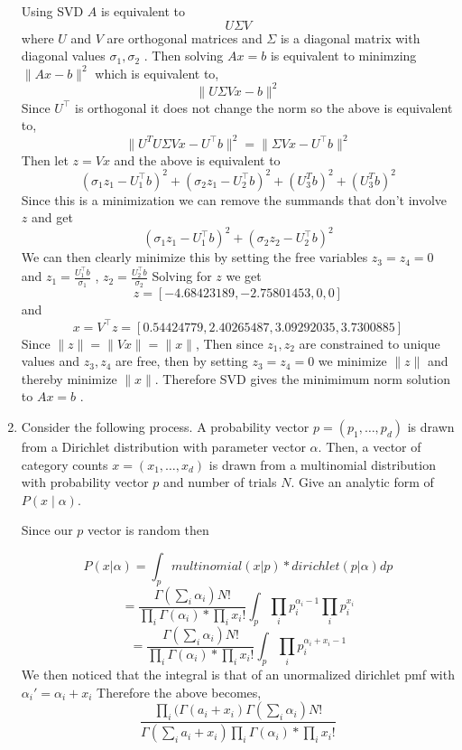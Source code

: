 \documentclass{article}
\begin{document}
\begin{enumerate}
\color{blue}
Using SVD $A$ is equivalent to 
$$
U \Sigma V
$$
where $U$ and $V$ are orthogonal matrices and $\Sigma$ is a diagonal matrix with diagonal values $\sigma_1, \sigma_2$ . 
Then solving $Ax = b$ is equivalent to minimzing $\lVert Ax - b \rVert ^ 2$ which is equivalent to,
$$
\lVert U \Sigma V x - b \rVert ^ 2
$$
Since $U^\top$ is orthogonal it does not change the norm so the above is equivalent to,
$$
\lVert U^T U \Sigma V x - U^\top b \rVert ^2 = \lVert \Sigma V x - U^\top b \rVert ^2
$$
Then let $z = V x$ and the above is equivalent to 
$$
(\sigma_1 z_1 - U_1^\top b)^2 + (\sigma_2 z_1 - U_2^\top b)^2  + (U_3^T b)^2 + (U_3^T b)^2
$$
Since this is a minimization we can remove the summands that don't involve $z$ and get
$$
(\sigma_1 z_1 - U_1^\top b)^2 + (\sigma_2 z_2 - U_2^\top b)^2 
$$
We can then clearly minimize this by setting the free variables $z_3 = z_4 = 0$ and
$z_1 = \frac{U_1^\top b}{\sigma_1}$ , $z_2 = \frac{U_2^\top b}{\sigma_2}$
Solving for $z$ we get
$$
z = [-4.68423189, -2.75801453,  0,  0]
$$  
and 
$$
x = V^\top z = [ 0.54424779, 2.40265487, 3.09292035, 3.7300885]
$$
Since $\lVert z \rVert = \lVert Vx \rVert = \lVert x \rVert$,
Then since $z_1, z_2$ are constrained to unique values and $z_3, z_4$ are free, then by setting $z_3=z_4=0$ we minimize $\lVert z \rVert$ and thereby minimize $\lVert x \rVert$. Therefore SVD gives the minimimum norm solution to $Ax = b$ .
\color{black}


\item
Consider the following process.  A probability vector $p=(p_1, \ldots, p_d)$ is drawn from a Dirichlet distribution with parameter vector $\alpha$.
Then, a vector of category counts $x=(x_1, \ldots, x_d)$ is drawn from a multinomial distribution with probability vector $p$ and number of trials $N$. Give an analytic form of $P(x \mid \alpha)$.  

\color{blue}
Since our $p$ vector is random then

$$P(x | \alpha) = \int_p multinomial(x | p) * dirichlet(p|\alpha) dp $$
$$
=\frac{\Gamma(\sum_i \alpha_i)N!}{\prod_i\Gamma(\alpha_i)*\prod_i x_i !} \int_p \prod_i p_i ^ {\alpha_i -1} \prod_i p_i ^{x_i}
$$
$$
=\frac{\Gamma(\sum_i \alpha_i)N!}{\prod_i\Gamma(\alpha_i)*\prod_i x_i !} \int_p \prod_i p_i ^ {\alpha_i + x_i -1} 
$$
We then noticed that the integral is that of an unormalized dirichlet pmf with $\alpha_i' = \alpha_i + x_i$
Therefore the above becomes,
$$
\frac{\prod_i(\Gamma(a_i + x_i)\Gamma(\sum_i \alpha_i)N!}{\Gamma(\sum_i a_i + x_i) \prod_i\Gamma(\alpha_i)*\prod_i x_i !}
$$


\end{enumerate}
\end{document}
